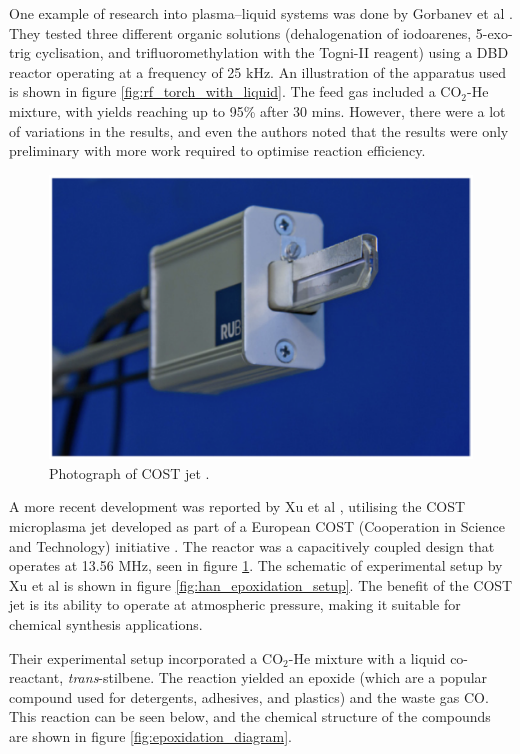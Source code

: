 One example of research into plasma–liquid systems was done by Gorbanev et al \cite{Gorbanev2017}. They tested three different organic solutions (dehalogenation of iodoarenes, 5-exo-trig cyclisation, and trifluoromethylation with the Togni-II reagent) using a DBD reactor operating at a frequency of 25 kHz. An illustration of the apparatus used is shown in figure \ref{fig:rf_torch_with_liquid}.  The feed gas included a CO$_2$-He mixture, with yields reaching up to 95\% after 30 mins. However, there were a lot of variations in the results, and even the authors noted that the results were only preliminary with more work required to optimise reaction efficiency.

\begin{figure}[h!]
	\centering
	\includegraphics[width=0.75\linewidth]{chapter_3/figures/COST_jet.png}
	\caption{Photograph of COST jet \cite{Golda2016}.}
	\label{fig:COST_jet}
\end{figure}

A more recent development was reported by  Xu et al \cite{Xu2021}, utilising the COST microplasma jet developed as part of a European COST (Cooperation in Science and Technology) initiative \cite{VonDerGathen2008}. The reactor was a capacitively coupled design that operates at 13.56 MHz, seen in figure \ref{fig:COST_jet}. The schematic of experimental setup by Xu et al is shown in figure \ref{fig:han_epoxidation_setup}. The benefit of the COST jet is its ability to operate at atmospheric pressure, making it suitable for chemical synthesis applications.

Their experimental setup incorporated a CO$_2$-He mixture  with a liquid co-reactant, \textit{trans}-stilbene. The reaction yielded an epoxide (which are a popular compound used for detergents, adhesives, and plastics) and the waste gas CO. This reaction can be seen below, and the chemical structure of the compounds are shown in figure \ref{fig:epoxidation_diagram}.

